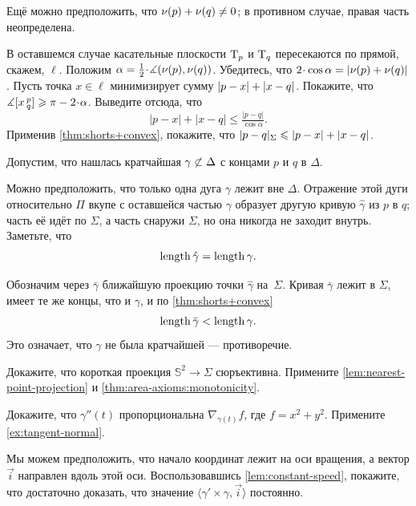 \begin{multicols}{2}
Ещё можно предположить, что $\Norm(p)\z+\Norm(q)\z\ne 0$; в противном случае, правая часть неопределена.

В оставшемся случае касательные плоскости $\mathrm{T}_p$ и $\mathrm{T}_q$ пересекаются по прямой, скажем, $\ell$.
Положим $\alpha=\tfrac12\cdot\measuredangle(\Norm(p),\Norm(q))$.
Убедитесь, что $2\cdot\cos\alpha\z= |\Norm(p)+\Norm(q)|$.
Пусть точка $x\in \ell$ минимизирует сумму $|p-x|\z+|x-q|$.
Покажите, что $\measuredangle\hinge xpq\ge \pi-2\cdot\alpha$.
Выведите отсюда, что 
\[
|p-x|+|x-q|\le \tfrac{|p-q|}{\cos\alpha}.
\]
Применив \ref{thm:shorts+convex}, покажите, что
$\dist{p}{q}\Sigma\z\le |p-x|\z+|x-q|$.

Допустим, что нашлась кратчайшая $\gamma\z{\not\subset}\Delta$ с концами $p$ и $q$ в $\Delta$.

Можно предположить, что только одна дуга $\gamma$ лежит вне $\Delta$.
Отражение этой дуги относительно $\Pi$ вкупе с оставшейся частью $\gamma$ образует другую кривую $\hat\gamma$ из $p$ в $q$;
часть её идёт по $\Sigma$, 
а часть снаружи $\Sigma$,
но она никогда не заходит внутрь.
Заметьте, что
\[\mathop{\rm length}\nolimits\hat\gamma=\mathop{\rm length}\nolimits\gamma.\]

Обозначим через $\bar\gamma$ ближайшую проекцию точки $\hat\gamma$ на~$\Sigma$.
Кривая $\bar\gamma$ лежит в $\Sigma$, 
имеет те же концы, что и $\gamma$,
и по \ref{thm:shorts+convex}
\[\mathop{\rm length}\nolimits\bar\gamma<\mathop{\rm length}\nolimits\gamma.\]
Это означает, что $\gamma$ не была кратчайшей --- 
противоречие.

Докажите, что короткая проекция $\mathbb{S}^2\to\Sigma$ сюръективна.
Примените \ref{lem:nearest-point-projection} и \ref{thm:area-axioms:monotonicity}.


\setcounter{eqtn}{0}

Докажите, что $\gamma''(t)$ пропорциональна $\nabla_{\gamma(t)} f$, где $f=x^2+y^2$. 
Примените \ref{ex:tangent-normal}.

Мы можем предположить, что начало координат лежит на оси вращения, а вектор $\vec i$ направлен вдоль этой оси.
Воспользовавшись \ref{lem:constant-speed}, покажите, что достаточно доказать, что 
значение $\langle\gamma'\times \gamma,\vec i\rangle$ постоянно.


\end{multicols}
